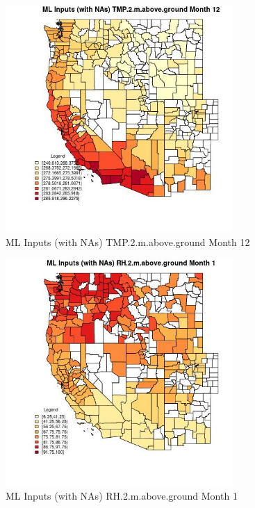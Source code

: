 \begin{figure} 
\centering  
\includegraphics[width=0.77\textwidth]{Code_Outputs/Report_ML_input_PM25_Step4_part_f_de_duplicated_aves_prioritize_24hr_obswNAs_CountyTMP2mabovegroundmedianMonth12.jpg} 
\caption{\label{fig:Report_ML_input_PM25_Step4_part_f_de_duplicated_aves_prioritize_24hr_obswNAsCountyTMP2mabovegroundmedianMonth12}ML Inputs (with NAs) TMP.2.m.above.ground Month 12} 
\end{figure} 
 

\begin{figure} 
\centering  
\includegraphics[width=0.77\textwidth]{Code_Outputs/Report_ML_input_PM25_Step4_part_f_de_duplicated_aves_prioritize_24hr_obswNAs_CountyRH2mabovegroundmedianMonth1.jpg} 
\caption{\label{fig:Report_ML_input_PM25_Step4_part_f_de_duplicated_aves_prioritize_24hr_obswNAsCountyRH2mabovegroundmedianMonth1}ML Inputs (with NAs) RH.2.m.above.ground Month 1} 
\end{figure} 
 

